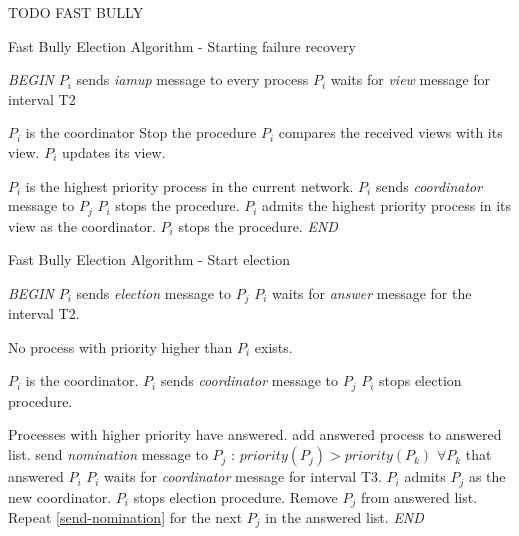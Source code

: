 \documentclass[dareport.tex]{subfiles}
\begin{document}
TODO FAST BULLY
\begin{algorithm}[H]
	\caption{Fast Bully Election Algorithm - Starting failure recovery}
	\label{fast-bully-algorithm-start-failure-recovery}
	\begin{algorithmic}[1]
		\BState \emph{BEGIN}
		\State $P_{i}$ sends \emph{iamup} message to every process
		\State $P_{i}$ waits for \emph{view} message for interval T2
		
		\Comment $P_{i}$ is the coordinator
		\State Stop the procedure
		\Else
		\State $P_{i}$ compares the received views with its view.
			\State $P_{i}$ updates its view.
		\EndIf
		
		\Comment $P_{i}$ is the highest priority process in the current network.
				\State $P_{i}$ sends \emph{coordinator} message to $P_{j}$
				\State $P_{i}$ stops the procedure.
			\EndFor
		\Else
			\State $P_{i}$ admits the highest priority process in its view as the coordinator.
			\State $P_{i}$ stops the procedure.
		\EndIf
		\EndIf
		\EndProcedure
		\BState \emph{END}
	\end{algorithmic}
\end{algorithm}
\begin{algorithm}[H]
	\caption{Fast Bully Election Algorithm -  Start election}
	\label{fast-bully-algorithm-start-election}
	\begin{algorithmic}[1]
		\BState \emph{BEGIN}
				\State $P_{i}$ sends \emph{election} message to $P_{j}$
			\EndFor
			\State $P_{i}$ waits for \emph{answer} message for the interval T2.
				
			\Comment No process with priority higher than $P_{i}$ exists.
				
			\Comment $P_{i}$ is the coordinator.
					\State $P_{i}$ sends \emph{coordinator} message to $P_{j}$
				\EndFor
				\State $P_{i}$ stops election procedure.
			\Else
			
			\Comment Processes with higher priority have answered.
				\State add answered process to answered list.
				\State send \emph{nomination} message to $P_{j}$ : $priority(P_{j}) > priority(P_{k})$ $\forall P_{k}$ that answered  $P_{i}$ \label{send-nomination}
				\State $P_{i}$ waits for \emph{coordinator} message for interval T3.
					\State $P_{i}$ admits $P_{j}$ as the new coordinator.
					\State $P_{i}$ stops election procedure.
				\Else
					\State Remove $P_{j}$ from answered list.
					\State Repeat \cref{send-nomination} for the next $P_{j}$ in the answered list.
						\State {}
					\EndIf
				\EndIf
			\EndIf
		\EndProcedure
		\BState \emph{END}
	\end{algorithmic}
\end{algorithm}
\end{document}
